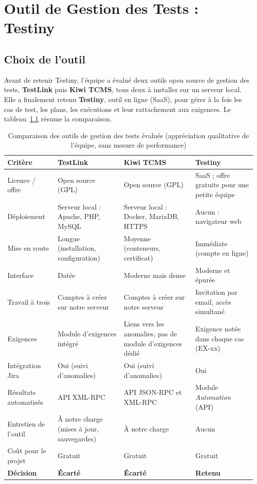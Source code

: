 \documentclass[12pt,a4paper]{report}
\begin{document}
\chapter{Outil de Gestion des Tests : Testiny}\label{ch:outil}

\section{Choix de l'outil}
Avant de retenir Testiny, l'équipe a évalué deux outils open source de gestion des tests, \textbf{TestLink} puis \textbf{Kiwi TCMS}, tous deux à installer sur un serveur local. Elle a finalement retenu \textbf{Testiny}, outil en ligne (SaaS), pour gérer à la fois les cas de test, les plans, les exécutions et leur rattachement aux exigences. Le tableau~\ref{tab:benchmark} résume la comparaison.

\begin{table}[H]
\centering
\caption{Comparaison des outils de gestion des tests évalués (appréciation qualitative de l'équipe, sans mesure de performance)}\label{tab:benchmark}
\small
\begin{tabularx}{\textwidth}{@{}>{\raggedright\arraybackslash}p{2.9cm}>{\raggedright\arraybackslash}X>{\raggedright\arraybackslash}X>{\raggedright\arraybackslash}X@{}}
\toprule
\rowcolor{evlight}\textbf{Critère} & \textbf{TestLink} & \textbf{Kiwi TCMS} & \textbf{Testiny}\\
\midrule
Licence / offre & Open source (GPL) & Open source (GPL) & SaaS ; offre gratuite pour une petite équipe\\
Déploiement & Serveur local : Apache, PHP, MySQL & Serveur local : Docker, MariaDB, HTTPS & Aucun : navigateur web\\
Mise en route & Longue (installation, configuration) & Moyenne (conteneurs, certificat) & Immédiate (compte en ligne)\\
Interface & Datée & Moderne mais dense & Moderne et épurée\\
Travail à trois & Comptes à créer sur notre serveur & Comptes à créer sur notre serveur & Invitation par email, accès simultané\\
Exigences & Module d'exigences intégré & Liens vers les anomalies, pas de module d'exigences dédié & Exigence notée dans chaque cas (EX-xx)\\
Intégration Jira & Oui (suivi d'anomalies) & Oui (suivi d'anomalies) & Oui\\
Résultats automatisés & API XML-RPC & API JSON-RPC et XML-RPC & Module \textit{Automation} (API)\\
Entretien de l'outil & À notre charge (mises à jour, sauvegardes) & À notre charge & Aucun\\
Coût pour le projet & Gratuit & Gratuit & Gratuit\\
\midrule
\textbf{Décision} & \textcolor{kored}{\textbf{Écarté}} & \textcolor{kored}{\textbf{Écarté}} & \textcolor{okgreen}{\textbf{Retenu}}\\
\bottomrule
\end{tabularx}
\end{table}
\end{document}
